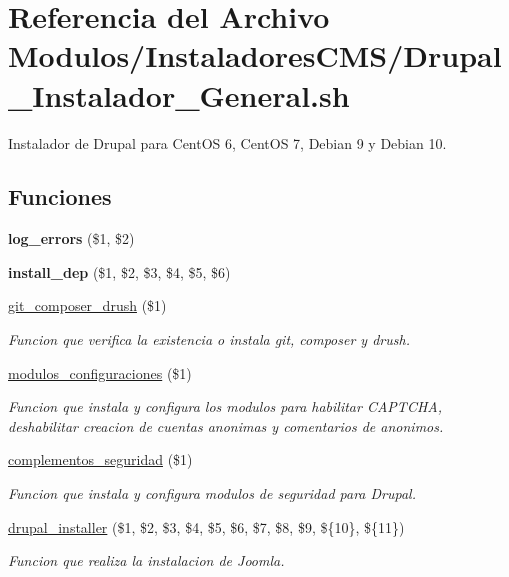 \hypertarget{Drupal__Instalador__General_8sh}{}\section{Referencia del Archivo Modulos/\+Instaladores\+C\+M\+S/\+Drupal\+\_\+\+Instalador\+\_\+\+General.sh}
\label{Drupal__Instalador__General_8sh}


Instalador de Drupal para Cent\+OS 6, Cent\+OS 7, Debian 9 y Debian 10.  


\subsection*{Funciones}
\begin{DoxyCompactItemize}
\item 
\mbox{\label{Drupal__Instalador__General_8sh_a92067b58a8478c9841b2cd9b75ea3565}} 
{\bfseries log\+\_\+errors} (\$1, \$2)
\item 
\mbox{\label{Drupal__Instalador__General_8sh_a0def5b6b697b8869c4772673d56a5a4a}} 
{\bfseries install\+\_\+dep} (\$1, \$2, \$3, \$4, \$5, \$6)
\item 
\hyperlink{Drupal__Instalador__General_8sh_a3cc44682ce03ae17ac41a78185920c59}{git\+\_\+composer\+\_\+drush} (\$1)
\begin{DoxyCompactList}\small\item\em Funcion que verifica la existencia o instala git, composer y drush. \end{DoxyCompactList}\item 
\hyperlink{Drupal__Instalador__General_8sh_ae5ce76ad68690ff00cb63811e18c8a37}{modulos\+\_\+configuraciones} (\$1)
\begin{DoxyCompactList}\small\item\em Funcion que instala y configura los modulos para habilitar C\+A\+P\+T\+C\+HA, deshabilitar creacion de cuentas anonimas y comentarios de anonimos. \end{DoxyCompactList}\item 
\hyperlink{Drupal__Instalador__General_8sh_a13df4a377004ee8af67f8e2495fe1afd}{complementos\+\_\+seguridad} (\$1)
\begin{DoxyCompactList}\small\item\em Funcion que instala y configura modulos de seguridad para Drupal. \end{DoxyCompactList}\item 
\hyperlink{Drupal__Instalador__General_8sh_a364d1278ff9a6b2b30118cf81b91734c}{drupal\+\_\+installer} (\$1, \$2, \$3, \$4, \$5, \$6, \$7, \$8, \$9, \$\{10\}, \$\{11\})
\begin{DoxyCompactList}\small\item\em Funcion que realiza la instalacion de Joomla. \end{DoxyCompactList}\end{DoxyCompactItemize}


